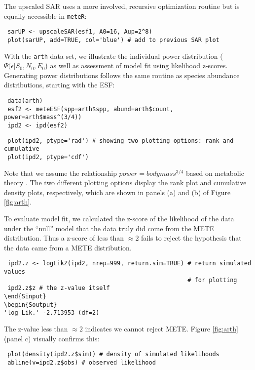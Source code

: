 The upscaled SAR uses a more involved, recursive optimization routine
\citep[see eqns (7.70) and (7.71) in][]{Harte:2011ut} but is equally
accessible in \texttt{meteR}:

\begin{verbatim}
 sarUP <- upscaleSAR(esf1, A0=16, Aup=2^8)
 plot(sarUP, add=TRUE, col='blue') # add to previous SAR plot
\end{verbatim}


With the \texttt{arth} data set, we illustrate the individual power
distribution ($\Psi(\epsilon | S_0, N_0, E_0$) as well as assessment
of model fit using likelihood z-scores. Generating power distributions
follows the same routine as species abundance distributions, starting
with the ESF:

\begin{verbatim}
 data(arth)
 esf2 <- meteESF(spp=arth$spp, abund=arth$count, power=arth$mass^(3/4))
 ipd2 <- ipd(esf2)
\end{verbatim}

\begin{verbatim}
 plot(ipd2, ptype='rad') # showing two plotting options: rank and cumulative
 plot(ipd2, ptype='cdf')
\end{verbatim}

Note that we assume the relationship $power=body mass^{3/4}$ based on
metabolic theory \citep{brown2004metab}. The two different plotting
options display the rank plot and cumulative density plots,
respectively, which are shown in panels (a) and (b) of Figure
\ref{fig:arth}.

To evaluate model fit, we calculated the z-score of the likelihood of
the data under the ``null'' model that the data truly did come from
the METE distribution. Thus a z-score of less than $\approx 2$ fails
to reject the hypothesis that the data came from a METE distribution.
\begin{verbatim}
 ipd2.z <- logLikZ(ipd2, nrep=999, return.sim=TRUE) # return simulated values 
                                                    # for plotting
 ipd2.z$z # the z-value itself
\end{Sinput}
\begin{Soutput}
'log Lik.' -2.713953 (df=2)
\end{verbatim}
The z-value less than $\approx 2$ indicates we cannot reject METE.
Figure \ref{fig:arth} (panel c) visually confirms this:
\begin{verbatim}
 plot(density(ipd2.z$sim)) # density of simulated likelihoods
 abline(v=ipd2.z$obs) # observed likelihood
\end{verbatim}

